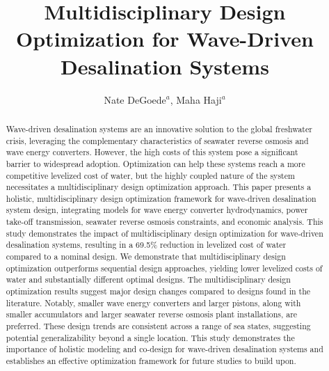 \documentclass[a4paper,12pt]{elsarticle}
\begin{document}
\begin{frontmatter}

\title{Multidisciplinary Design Optimization for Wave-Driven Desalination Systems}

\author{Nate DeGoede$^a$, Maha Haji$^a$}


\begin{abstract}
Wave-driven desalination systems are an innovative solution to the global freshwater crisis, leveraging the complementary characteristics of seawater reverse osmosis and wave energy converters. However, the high costs of this system pose a significant barrier to widespread adoption. Optimization can help these systems reach a more competitive levelized cost of water, but the highly coupled nature of the system necessitates a multidisciplinary design optimization approach. This paper presents a holistic, multidisciplinary design optimization framework for wave-driven desalination system design, integrating models for wave energy converter hydrodynamics, power take-off transmission, seawater reverse osmosis constraints, and economic analysis. This study demonstrates the impact of multidisciplinary design optimization for wave-driven desalination systems, resulting in a 69.5\% reduction in levelized cost of water compared to a nominal design. We demonstrate that multidisciplinary design optimization outperforms sequential design approaches, yielding lower levelized costs of water and substantially different optimal designs. The multidisciplinary design optimization results suggest major design changes compared to designs found in the literature. Notably, smaller wave energy converters and larger pistons, along with smaller accumulators and larger seawater reverse osmosis plant installations, are preferred. These design trends are consistent across a range of sea states, suggesting potential generalizability beyond a single location. This study demonstrates the importance of holistic modeling and co-design for wave-driven desalination systems and establishes an effective optimization framework for future studies to build upon.

\end{abstract}

\end{frontmatter}
\end{document}
